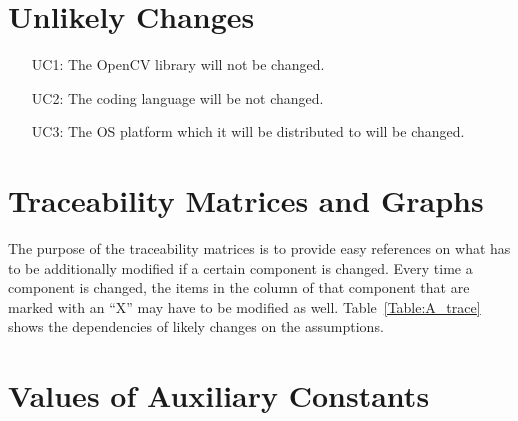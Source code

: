 \documentclass[12pt]{article}
\begin{document}
\section{Unlikely Changes}    

\noindent \begin{itemize}
\item [UC1:] The OpenCV library will not be changed.
\item [UC2:] The coding language will be not changed.
\item [UC3:] The OS platform which it will be distributed to will be changed.
\end{itemize}

\section{Traceability Matrices and Graphs}
The purpose of the traceability matrices is to provide easy references on what
has to be additionally modified if a certain component is changed.  Every time a
component is changed, the items in the column of that component that are marked
with an ``X'' may have to be modified as well.  Table~\ref{Table:A_trace} shows the dependencies of likely changes on
the assumptions.








\section{Values of Auxiliary Constants}




\newpage

 
 
\newpage



\newpage{}
\end{document}
